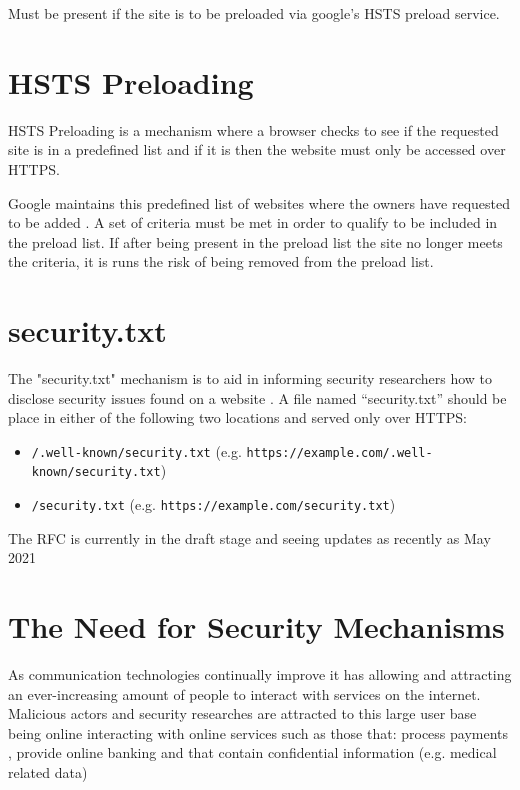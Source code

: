 \documentclass{mscreport}
\begin{document}
Must be present if the site is to be preloaded via google's HSTS preload service.

\section{HSTS Preloading}
HSTS Preloading is a mechanism where a browser checks to see if the requested site is in a predefined list and if it is then the website must only be accessed over HTTPS.

\noindent \vspace{0.3cm}
Google maintains this predefined list of websites where the owners have requested to be added \cite{Hodges2012-pe}.
A set of criteria must be met in order to qualify to be included in the preload list. If after being present in the preload list the site no longer meets the criteria, it is runs the risk of being removed from the preload list.

\newpage

\section{security.txt}
The "security.txt" mechanism is to aid in informing security researchers how to disclose security issues found on a website \cite{Foudil2021-vh}.
A file named “security.txt” should be place in either of the following two locations and served only over HTTPS:

\begin{itemize}
	\setlength\itemsep{0.1em}
	\item \texttt{/.well-known/security.txt} (e.g. \texttt{https://example.com/.well-known/security.txt})
	\item \texttt{/security.txt} (e.g. \texttt{https://example.com/security.txt})
\end{itemize}

\noindent
The RFC is currently in the draft stage and seeing updates as recently as May 2021

\newpage

\section{The Need for Security Mechanisms}

As communication technologies continually improve it has allowing and attracting an ever-increasing amount of people to interact with services on the internet. Malicious actors and security researches are attracted to this large user base being online interacting with online services such as those that: process payments \cite{Herman2019-zb}, provide online banking \cite{Gezer2019-oy} and that contain confidential information (e.g. medical related data) \cite{Mrdjenovich2020-vz}
\end{document}
